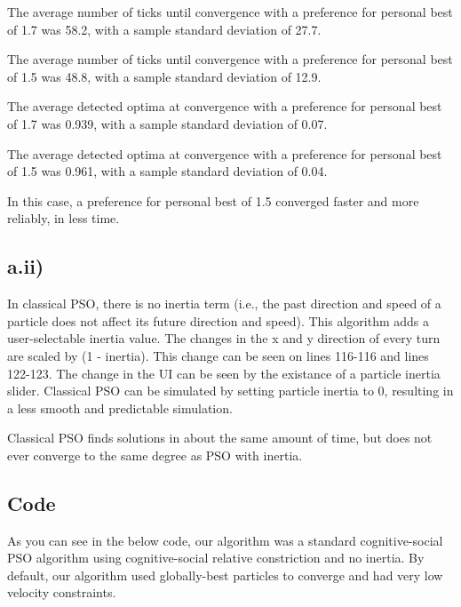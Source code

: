 \documentclass[12pt]{article}
\begin{document}
The average number of ticks until convergence with a preference for personal best of 1.7 was 58.2, with a sample standard deviation of 27.7.

The average number of ticks until convergence with a preference for personal best of 1.5 was 48.8, with a sample standard deviation of 12.9.

The average detected optima at convergence with a preference for personal best of 1.7 was 0.939, with a sample standard deviation of 0.07.

The average detected optima at convergence with a preference for personal best of 1.5 was 0.961, with a sample standard deviation of 0.04.

In this case, a preference for personal best of 1.5 converged faster and more reliably, in less time.

\subsection*{a.ii)}
In classical PSO, there is no inertia term (i.e., the past direction and speed of a particle does not affect its future direction and speed). This algorithm adds a user-selectable inertia value. The changes in the x and y direction of every turn are scaled by (1 - inertia). This change can be seen on lines 116-116 and lines 122-123. The change in the UI can be seen by the existance of a particle inertia slider. Classical PSO can be simulated by setting particle inertia to 0, resulting in a less smooth and predictable simulation.

Classical PSO finds solutions in about the same amount of time, but does not ever converge to the same degree as PSO with inertia.

\subsection*{Code}
As you can see in the below code, our algorithm was a standard cognitive-social PSO algorithm using cognitive-social relative constriction and no inertia. By default, our algorithm used globally-best particles to converge and had very low velocity constraints.


\end{document}
